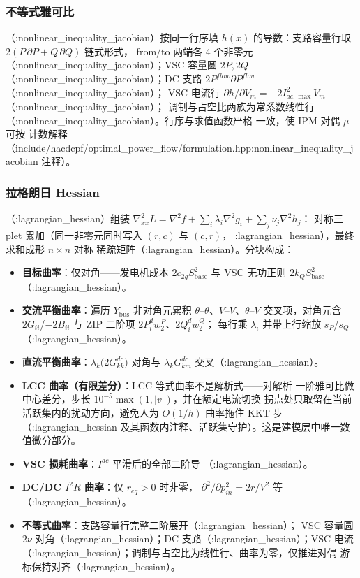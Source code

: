 \subsubsection*{不等式雅可比}
（:nonlinear\_inequality\_jacobian）按同一行序填
$h(x)$ 的导数：支路容量行取 $2(P\,\partial P+Q\,\partial Q)$ 链式形式，
from/to 两端各 4 个非零元（:nonlinear\_inequality\_jacobian）；VSC 容量圆 $2P,2Q$
（:nonlinear\_inequality\_jacobian）；DC 支路 $2P^{flow}\partial P^{flow}$（:nonlinear\_inequality\_jacobian）；
VSC 电流行 $\partial h/\partial V_m=-2I_{ac,\max}^2V_m$（:nonlinear\_inequality\_jacobian）；
调制与占空比两族为常系数线性行（:nonlinear\_inequality\_jacobian）。行序与求值函数严格
一致，使 IPM 对偶 $\mu$ 可按  计数解释
（include/hacdcpf/optimal\_power\_flow/formulation.hpp:nonlinear\_inequality\_jacobian 注释）。

\subsubsection*{拉格朗日 Hessian}
（:lagrangian\_hessian）组装
$\nabla^2_{xx}L=\nabla^2f+\sum_i\lambda_i\nabla^2g_i+\sum_j\nu_j\nabla^2h_j$：
对称三plet 累加（同一非零元同时写入 $(r,c)$ 与 $(c,r)$，
:lagrangian\_hessian），最终  求和成形 $n\times n$ 对称
稀疏矩阵（:lagrangian\_hessian）。分块构成：

\begin{itemize}
\item \textbf{目标曲率}：仅对角——发电机成本 $2c_{2g}S_{\mathrm{base}}^2$
  与 VSC 无功正则 $2k_QS_{\mathrm{base}}^2$（:lagrangian\_hessian）。
\item \textbf{交流平衡曲率}：遍历 $Y_{\mathrm{bus}}$ 非对角元累积
  $\theta$--$\theta$、$V$--$V$、$\theta$--$V$ 交叉项，对角元含
  $2G_{ii}$/$-2B_{ii}$ 与 ZIP 二阶项 $2P^d_iw^{P}_2$、$2Q^d_iw^{Q}_2$；
  每行乘 $\lambda_i$ 并带上行缩放 $s_P$/$s_Q$（:lagrangian\_hessian）。
\item \textbf{直流平衡曲率}：$\lambda_k\big(2G^{dc}_{kk}\big)$ 对角与
  $\lambda_kG^{dc}_{km}$ 交叉（:lagrangian\_hessian）。
\item \textbf{LCC 曲率（有限差分）}：LCC 等式曲率不是解析式——对解析
  一阶雅可比做中心差分，步长 $10^{-5}\max(1,|v|)$，并在额定电流切换
  拐点处只取留在当前活跃集内的扰动方向，避免人为 $O(1/h)$ 曲率拖住
  KKT 步（:lagrangian\_hessian 及其函数内注释、活跃集守护）。这是建模层中唯一数值微分部分。
\item \textbf{VSC 损耗曲率}：$I^{ac}$ 平滑后的全部二阶导
  （:lagrangian\_hessian）。
\item \textbf{DC/DC $I^2R$ 曲率}：仅 $r_{eq}>0$ 时非零，
  $\partial^2/\partial p_{in}^2=2r/V^2$ 等（:lagrangian\_hessian）。
\item \textbf{不等式曲率}：支路容量行完整二阶展开（:lagrangian\_hessian）；
  VSC 容量圆 $2\nu$ 对角（:lagrangian\_hessian）；DC 支路（:lagrangian\_hessian）；VSC
  电流（:lagrangian\_hessian）；调制与占空比为线性行、曲率为零，仅推进对偶
  游标保持对齐（:lagrangian\_hessian）。
\end{itemize}

